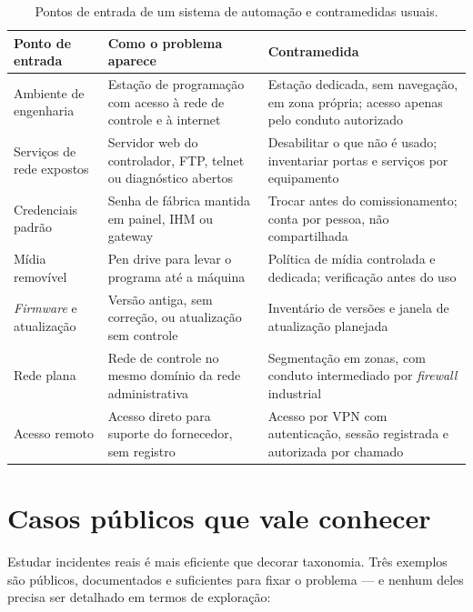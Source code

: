 \begin{table}[H]
  \centering
  \caption{Pontos de entrada de um sistema de automação e contramedidas usuais.}
  \label{tab:superficie-ataque}
  \begin{tabular}{p{3.5cm} p{5.3cm} p{5.5cm}}
    \toprule
    Ponto de entrada & Como o problema aparece & Contramedida \\
    \midrule
    Ambiente de engenharia
      & Estação de programação com acesso à rede de controle e à internet
      & Estação dedicada, sem navegação, em zona própria; acesso apenas pelo conduto autorizado \\
    \addlinespace
    Serviços de rede expostos
      & Servidor web do controlador, FTP, telnet ou diagnóstico abertos
      & Desabilitar o que não é usado; inventariar portas e serviços por equipamento \\
    \addlinespace
    Credenciais padrão
      & Senha de fábrica mantida em painel, IHM ou gateway
      & Trocar antes do comissionamento; conta por pessoa, não compartilhada \\
    \addlinespace
    Mídia removível
      & Pen drive para levar o programa até a máquina
      & Política de mídia controlada e dedicada; verificação antes do uso \\
    \addlinespace
    \emph{Firmware} e atualização
      & Versão antiga, sem correção, ou atualização sem controle
      & Inventário de versões e janela de atualização planejada \\
    \addlinespace
    Rede plana
      & Rede de controle no mesmo domínio da rede administrativa
      & Segmentação em zonas, com conduto intermediado por \emph{firewall} industrial \\
    \addlinespace
    Acesso remoto
      & Acesso direto para suporte do fornecedor, sem registro
      & Acesso por VPN com autenticação, sessão registrada e autorizada por chamado \\
    \bottomrule
  \end{tabular}
\end{table}

\section{Casos públicos que vale conhecer}

Estudar incidentes reais é mais eficiente que decorar taxonomia. Três exemplos são públicos,
documentados e suficientes para fixar o problema --- e nenhum deles precisa ser detalhado em termos de
exploração:

